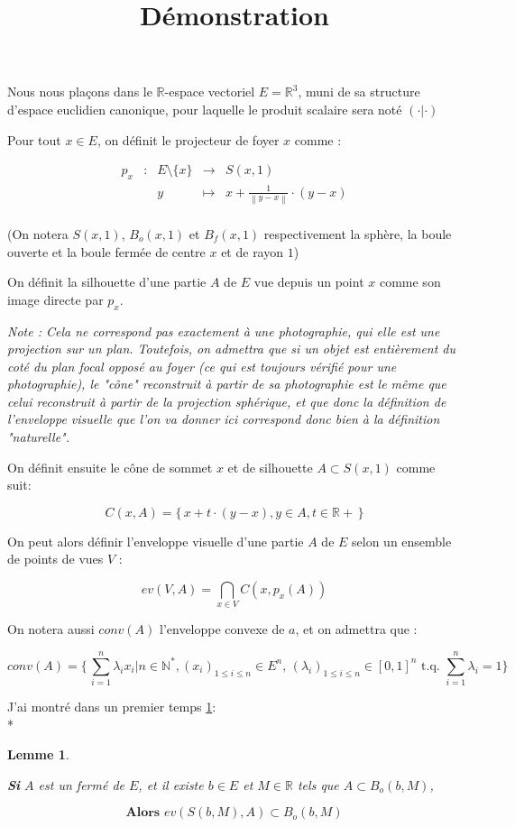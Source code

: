 \documentclass[a4paper]{article}
\title{Démonstration}
\newcommand{\norm}[1]{\left\lVert#1\right\rVert}
\newtheorem{lem}{Lemme}
\begin{document}
Nous nous plaçons dans le $\mathbb{R}$-espace vectoriel $E = \mathbb{R}^{3}$, muni de sa structure d'espace euclidien canonique, pour laquelle le produit scalaire sera noté $(\cdot|\cdot)$


Pour tout $x\in E$, on définit le projecteur de foyer $x$ comme :

\[\begin{array}{ccccl}
p_{x} & : & E\setminus\{x\} & \to & S(x, 1) \\
 & & y & \mapsto & x  + \frac{1}{\norm{y - x}} \cdot (y - x) \\
\end{array}\]

(On notera $S(x, 1)$, $B_{o}(x, 1)$ et $B_{f}(x, 1)$ respectivement la sphère, la boule ouverte et la boule fermée de centre $x$ et de rayon $1$)


On définit la silhouette d'une  partie $A$ de $E$ vue depuis un point $x$ comme son image directe par $p_{x}$.

\textit{Note : Cela ne correspond pas exactement à une photographie, qui elle est une projection sur un plan. Toutefois, on admettra que si un objet est entièrement du coté du plan focal opposé au foyer (ce qui est toujours vérifié pour une photographie), le "cône" reconstruit à partir de sa photographie est le même que celui reconstruit à partir de la projection sphérique, et que donc la définition de l'enveloppe visuelle que l'on va donner ici correspond donc bien à la définition "naturelle".}

On définit ensuite le cône de sommet $x$ et de silhouette $A \subset S(x, 1)$ comme suit:

\[C(x,A) = \{\,x + t\cdot{}(y - x), y\in{}A, t\in\mathbb{R}+\,\}\]

On peut alors définir l'enveloppe visuelle d'une partie $A$ de $E$ selon un ensemble de points de vues $V$ :

\[ev(V, A) = \bigcap_{x\in{}V}C(x,p_{x}(A))\]

On notera aussi $conv(A)$ l'enveloppe convexe de $a$, et on admettra que :

\[conv(A) = \{\,\sum_{i=1}^{n} \lambda_{i} x_{i}| n\in{}\mathbb{N}^{*}, (x_{i})_{1\leqslant i \leqslant n} \in E^{n}, \, (\lambda_{i})_{1\leqslant i \leqslant n} \in [0, 1]^{n}\text{ t.q. } \sum_{i=1}^{n} \lambda_{i} = 1\}\]

J'ai montré dans un premier temps \ref{lem1}:\\*
\begin{lem}\label{lem1}

\textbf{Si} $A$ est un fermé de $E$, et il existe $b \in E$ et $M \in \mathbb{R}$ tels que $A \subset B_{o}(b, M)$,

\[\textbf{Alors } ev(S(b,M), A) \subset B_{o}(b, M)\]

\end{lem}
\end{document}

